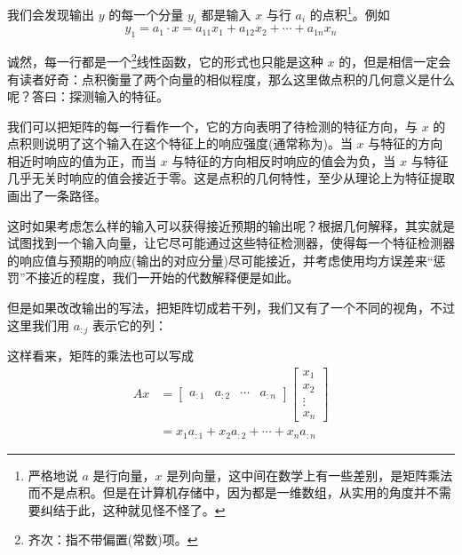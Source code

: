 我们会发现输出 $y$ 的每一个分量 $y_i$ 都是输入 $x$ 与行 $a_i$ 的点积\footnote{严格地说 $a$ 是行向量，$x$ 是列向量，这中间在数学上有一些差别，是矩阵乘法而不是点积。但是在计算机存储中，因为都是一维数组，从实用的角度并不需要纠结于此，这种就见怪不怪了。}。例如
\[
    y_1 = a_1 \cdot x = a_{11}x_1 + a_{12}x_2 + \cdots + a_{1n}x_n
\]

诚然，每一行都是一个\footnote{齐次：指不带偏置(常数)项。}线性函数，它的形式也只能是这种 $x$ 的，但是相信一定会有读者好奇：点积衡量了两个向量的相似程度，那么这里做点积的几何意义是什么呢？答曰：探测输入的特征。

我们可以把矩阵的每一行看作一个，它的方向表明了待检测的特征方向，与 $x$ 的点积则说明了这个输入在这个特征上的响应强度(通常称为)。当 $x$ 与特征的方向相近时响应的值为正，而当 $x$ 与特征的方向相反时响应的值会为负，当 $x$ 与特征几乎无关时响应的值会接近于零。这是点积的几何特性，至少从理论上为特征提取画出了一条路径。

这时如果考虑怎么样的输入可以获得接近预期的输出呢？根据几何解释，其实就是试图找到一个输入向量，让它尽可能通过这些特征检测器，使得每一个特征检测器的响应值与预期的响应(输出的对应分量)尽可能接近，并考虑使用均方误差来“惩罚”不接近的程度，我们一开始的代数解释便是如此。

但是如果改改输出的写法，把矩阵切成若干列，我们又有了一个不同的视角，不过这里我们用 $a_{:j}$ 表示它的列：
\begin{figure}[H]
    \centering
\end{figure}

这样看来，矩阵的乘法也可以写成
\[
\begin{aligned}
    Ax & = \begin{bmatrix}
        a_{:1} & a_{:2} & \cdots & a_{:n}
    \end{bmatrix}
    \begin{bmatrix}
        x_1 \\ x_2 \\ \vdots \\ x_n
    \end{bmatrix}
    \\
    &= x_1 a_{:1} + x_2 a_{:2} + \cdots + x_n a_{:n}
\end{aligned}
\]

